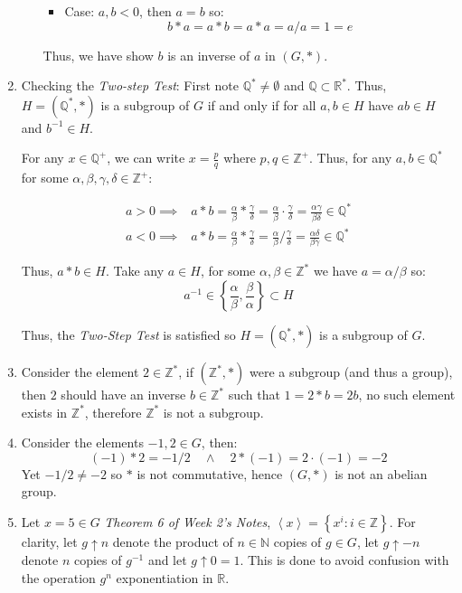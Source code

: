\documentclass[a4paper, 11pt]{article}
\newcommand{\NN}{\mathbb{N}}
\newcommand{\ZZ}{\mathbb{Z}}
\newcommand{\QQ}{\mathbb{Q}}
\newcommand{\RR}{\mathbb{R}}
\def\set#1{\left\{ #1 \right\}}
\def\gen#1{\left\langle#1 \right\rangle}
\begin{document}
\begin{enumerate}[label=(\alph*)]
\begin{itemize}
\begin{itemize}
				\item
				Case: $a,b<0$, then $a=b$ so:
				$$
					b*a = a*b = a*a = a/a = 1 = e 
				$$
			\end{itemize}

			Thus, we have show $b$ is an inverse of $a$ in $(G,*)$.
		\end{itemize}
	\item 
	Checking the \textit{Two-step Test}: First note $\QQ^*\neq \emptyset$ and $\QQ\subset\RR^*$. Thus, $H=(\QQ^*,*)$ is a subgroup of $G$ if and only if for all $a,b\in H$ have $ab\in H$ and $b^{-1}\in H$.  
	
	For any $x\in \QQ^+$, we can write $x=\frac pq$ where $p,q\in\ZZ^+$. Thus, for any $a,b\in\QQ^*$ for some $\alpha,\beta,\gamma,\delta \in \ZZ^+$: 

	\begin{align*}
		a > 0 \implies & a*b 
		= \frac \alpha\beta * \frac \gamma\delta 
		= \frac \alpha\beta \cdot \frac \gamma\delta
		= \frac {\alpha\gamma}{\beta\delta}\in\QQ^* \\
		a < 0 \implies & a*b 
		= \frac \alpha\beta * \frac \gamma\delta 
		= \frac \alpha\beta / \frac \gamma\delta  
		= \frac {\alpha\delta}{\beta\gamma} \in\QQ^*  
	\end{align*}		
	
	Thus, $a*b\in H$. Take any $a\in H$, for some $\alpha,\beta\in\ZZ^*$ we have $a=\alpha/\beta$ so:
	\[
		 a^{-1}\in\set{
			\frac\alpha\beta,
			\frac\beta\alpha
		}\subset H 
	\]

	Thus, the \textit{Two-Step Test} is satisfied so $H=(\QQ^*,*)$ is a subgroup of $G$. 

	\item 
	Consider the element $2\in\ZZ^*$, if $(\ZZ^*, *)$ were a subgroup (and thus a group), then $2$ should have an inverse $b\in\ZZ^*$ such that $1=2*b=2b$, no such element exists in $\ZZ^*$, therefore $\ZZ^*$ is not a subgroup.  

	\item 
	Consider the elements $-1,2 \in G$, then: 
	\[
		(-1) * 2 = -1/2  \quad \land \quad 2 * (-1) = 2 \cdot (-1) = -2 	
	\]
	Yet $-1/2 \neq -2$ so $*$ is not commutative, hence $(G,*)$ is not an abelian group. 

	\item 
	Let $x=5\in G$ \textit{Theorem 6 of Week 2's Notes}, $\gen x=\set{x^i: i\in\ZZ}$. For clarity, let $g\uparrow n$ denote the product of $n\in\NN$ copies of $g\in G$, let $g\uparrow -n$ denote $n$ copies of $g^{-1}$ and let $g\uparrow 0=1$. This is done to avoid confusion with the operation $g^n$ exponentiation in $\RR$. 
	

\end{enumerate}
\end{document}
